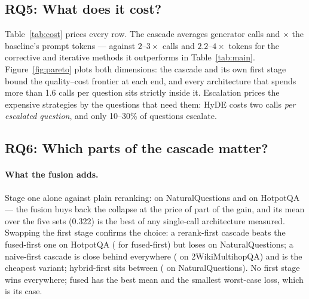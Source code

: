\subsection{RQ5: What does it cost?}
\label{sec:results-cost}

\begin{table}[t]
\centering\small
\caption{Cost per question, averaged over the sets each architecture ran
on, from the per-question logs. The last column is prompt tokens relative
to the naive baseline. The cross-encoder pass (rerank, fused, cascade) and
the CPU lexical search (BM25, hybrid, fused, cascade) are outside the
token count.}
\label{tab:cost}
\resizebox{\textwidth}{!}{\CostTable}
\end{table}

Table~\ref{tab:cost} prices every row. The cascade averages
\CostcascadeCalls{} generator calls and \CostcascadePromptRatio$\times$ the
baseline's prompt tokens --- against $2$--$3\times$ calls and
$2.2$--$4\times$ tokens for the corrective and iterative methods it
outperforms in Table~\ref{tab:main}. Figure~\ref{fig:pareto} plots both
dimensions: the cascade and its own first stage bound the quality--cost
frontier at each end, and every architecture that spends more than 1.6
calls per question sits strictly inside it. Escalation prices the
expensive strategies by the questions that need them: HyDE costs two
calls \emph{per escalated question}, and only 10--30\% of questions
escalate.

\subsection{RQ6: Which parts of the cascade matter?}
\label{sec:results-ablations}

\paragraph{What the fusion adds.} Stage one alone against plain reranking:
\RerankVsFusedNQExactMatchDiff{} on NaturalQuestions and
\RerankVsFusedHotpotQAExactMatchDiff{} on HotpotQA --- the fusion buys
back the collapse at the price of part of the gain, and its mean over the
five sets (0.322) is the best of any single-call architecture measured.
Swapping the first stage confirms the choice: a rerank-first cascade beats
the fused-first one on HotpotQA
(\CascadeRerankVsCascadeHotpotQAExactMatchDiff{} for fused-first) but
loses \CascadeRerankVsCascadeNQExactMatchDiff{} on NaturalQuestions; a
naive-first cascade is close behind everywhere
(\CascadeNaiveVsCascadeTwoWikiExactMatchDiff{} on 2WikiMultihopQA) and is
the cheapest variant; hybrid-first sits between
(\CascadeHybridVsCascadeNQExactMatchDiff{} on NaturalQuestions). No first
stage wins everywhere; fused has the best mean and the smallest
worst-case loss, which is its case.

